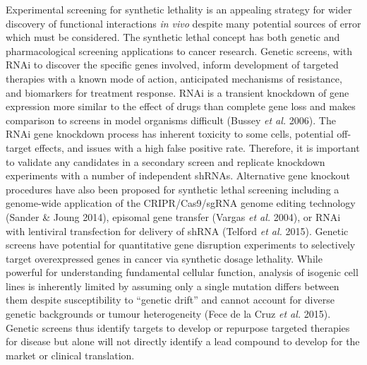 Experimental screening for synthetic lethality is an appealing strategy for wider discovery of functional interactions \textit{in vivo} despite many potential sources of error which must be considered. The synthetic lethal concept has both genetic and pharmacological screening applications to cancer research. Genetic screens, with RNAi to discover the specific genes involved, inform development of targeted therapies with a known mode of action, anticipated mechanisms of resistance, and biomarkers for treatment response. RNAi is a transient knockdown of gene expression more similar to the effect of drugs than complete gene loss and makes comparison to screens in model organisms difficult (Bussey\textit{ et al.} 2006). The RNAi gene knockdown process has inherent toxicity to some cells, potential off-target effects, and issues with a high false positive rate. Therefore, it is important to validate any candidates in a secondary screen and replicate knockdown experiments with a number of independent shRNAs. Alternative gene knockout procedures have also been proposed for synthetic lethal screening including a genome-wide application of the CRIPR/Cas9/sgRNA genome editing technology (Sander \& Joung 2014), episomal gene transfer (Vargas\textit{ et al.} 2004), or RNAi with lentiviral transfection for delivery of shRNA (Telford\textit{ et al.} 2015). Genetic screens have potential for quantitative gene disruption experiments to selectively target overexpressed genes in cancer via synthetic dosage lethality. While powerful for understanding fundamental cellular function, analysis of isogenic cell lines is inherently limited by assuming only a single mutation differs between them despite susceptibility to ``genetic drift'' and cannot account for diverse genetic backgrounds or tumour heterogeneity (Fece de la Cruz\textit{ et al.} 2015). Genetic screens thus identify targets to develop or repurpose targeted therapies for disease but alone will not directly identify a lead compound to develop for the market or clinical translation.  

